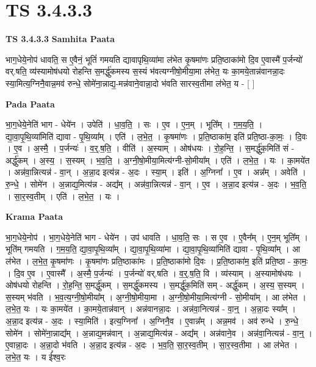 \documentclass[17pt]{extarticle}
\begin{document}
\section{ TS 3.4.3.3 }

\textbf{TS 3.4.3.3 } \newline
\textbf{Samhita Paata} \newline

भाग॒धेये॒नोप॑ धावति॒ स ए॒वैनं॒ भूतिं॑ गमयति द्यावापृथि॒व्या॑मा ल॑भेत कृ॒षमा॑णः प्रति॒ष्ठाका॑मो दि॒व ए॒वास्मै॑ प॒र्जन्यो॑ वर्.षति॒ व्य॑स्यामोष॑धयो रोहन्ति स॒मर्द्धु॑कमस्य स॒स्यं भ॑वत्यग्नीषो॒मीया॒मा ल॑भेत॒ यः का॒मये॒तान्न॑वानन्ना॒दः स्या॒मित्य॒ग्निनै॒वान्न॒मव॑ रुन्धे॒ सोमे॑ना॒न्नाद्य॒-मन्न॑वाने॒वान्ना॒दो भ॑वति सारस्व॒तीमा ल॑भेत॒ य - [  ] \newline

\textbf{Pada Paata} \newline

भा॒ग॒धेये॒नेति॑ भाग - धेये॑न । उपेति॑ । धा॒व॒ति॒ । सः । ए॒व । ए॒न॒म् । भूति᳚म् । ग॒म॒य॒ति॒ । द्या॒वा॒पृ॒थि॒व्या॑मिति॑ द्यावा - पृ॒थि॒व्या᳚म् । एति॑ । ल॒भे॒त॒ । कृ॒षमा॑णः । प्र॒ति॒ष्ठाका॑म॒ इति॑ प्रति॒ष्ठा-का॒मः॒ । दि॒वः । ए॒व । अ॒स्मै॒ । प॒र्जन्यः॑ । व॒र्॒.ष॒ति॒ । वीति॑ । अ॒स्याम् । ओष॑धयः । रो॒ह॒न्ति॒ । स॒मर्द्धु॑क॒मिति॑ सं - अर्द्धु॑कम् । अ॒स्य॒ । स॒स्यम् । भ॒व॒ति॒ । अ॒ग्नी॒षो॒मीया॒मित्य॑ग्नी-सो॒मीया᳚म् । एति॑ । ल॒भे॒त॒ । यः । का॒मये॑त । अन्न॑वा॒न्नित्यन्न॑ - वा॒न् । अ॒न्ना॒द इत्य॑न्न - अ॒दः । स्या॒म् । इति॑ । अ॒ग्निना᳚ । ए॒व । अन्न᳚म् । अवेति॑ । रु॒न्धे॒ । सोमे॑न । अ॒न्नाद्य॒मित्य॑न्न - अद्य᳚म् । अन्न॑वा॒न्नित्यन्न॑ - वा॒न् । ए॒व । अ॒न्ना॒द इत्य॑न्न - अ॒दः । भ॒व॒ति॒ । सा॒र॒स्व॒तीम् । एति॑ । ल॒भे॒त॒ । यः ।  \newline


\textbf{Krama Paata} \newline

भा॒ग॒धेये॒नोप॑ । भा॒ग॒धेये॒नेति॑ भाग - धेये॑न । उप॑ धावति । धा॒व॒ति॒ सः । स ए॒व । ए॒वैन᳚म् । ए॒न॒म् भूति᳚म् । भूति॑म् गमयति । ग॒म॒य॒ति॒ द्या॒वा॒पृ॒थि॒व्या᳚म् । द्या॒वा॒पृ॒थि॒व्या॑मा । द्या॒वा॒पृ॒थि॒व्या॑मिति॑ द्यावा - पृ॒थि॒व्या᳚म् । आ ल॑भेत । ल॒भे॒त॒ कृ॒षमा॑णः । कृ॒षमा॑णः प्रति॒ष्ठाका॑मः । प्र॒ति॒ष्ठाका॑मो दि॒वः । प्र॒ति॒ष्ठाका॑म॒ इति॑ प्रति॒ष्ठा - का॒मः॒ । दि॒व ए॒व । ए॒वास्मै᳚ । अ॒स्मै॒ प॒र्जन्यः॑ । प॒र्जन्यो॑ वर्.षति । व॒र्॒.ष॒ति॒ वि । व्य॑स्याम् । अ॒स्यामोष॑धयः । ओष॑धयो रोहन्ति । रो॒ह॒न्ति॒ स॒मर्द्धु॑कम् । स॒मर्द्धु॑कमस्य । स॒मर्द्धु॑क॒मिति॑ सम् - अर्द्धु॑कम् । अ॒स्य॒ स॒स्यम् । स॒स्यम् भ॑वति । भ॒व॒त्य॒ग्नी॒षो॒मीया᳚म् । अ॒ग्नी॒षो॒मीया॒मा । अ॒ग्नी॒षो॒मीया॒मित्य॑ग्नी - सो॒मीया᳚म् । आ ल॑भेत । ल॒भे॒त॒ यः । यः का॒मये॑त । का॒मये॒तान्न॑वान् । अन्न॑वानन्ना॒दः । अन्न॑वा॒नित्यन्न॑ - वा॒न्॒ । अ॒न्ना॒दः स्या᳚म् । अ॒न्ना॒द इत्य॑न्न - अ॒दः । स्या॒मिति॑ । इत्य॒ग्निना᳚ । अ॒ग्निनै॒व । ए॒वान्न᳚म् । अन्न॒मव॑ । अव॑ रुन्धे । रु॒न्धे॒ सोमे॑न । सोमे॑ना॒न्नाद्य᳚म् । अ॒न्नाद्य॒मन्न॑वान् । अ॒न्नाद्य॒मित्य॑न्न - अद्य᳚म् । अन्न॑वाने॒व । अन्न॑वा॒नित्यन्न॑ - वा॒न्॒ । ए॒वान्ना॒दः । अ॒न्ना॒दो भ॑वति । अ॒न्ना॒द इत्य॑न्न - अ॒दः । भ॒व॒ति॒ सा॒र॒स्व॒तीम् । सा॒र॒स्व॒तीमा । आ ल॑भेत । ल॒भे॒त॒ यः । य ई᳚श्व॒रः \newline
\end{document}
